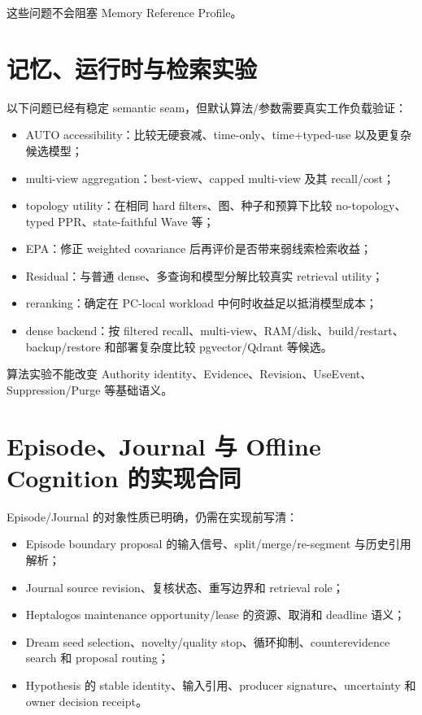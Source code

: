 这些问题不会阻塞 Memory Reference Profile。

\section{记忆、运行时与检索实验}

以下问题已经有稳定 semantic seam，但默认算法/参数需要真实工作负载验证：

\begin{itemize}
\item AUTO accessibility：比较无硬衰减、time-only、time+typed-use 以及更复杂候选模型；
\item multi-view aggregation：best-view、capped multi-view 及其 recall/cost；
\item topology utility：在相同 hard filters、图、种子和预算下比较 no-topology、typed PPR、state-faithful Wave 等；
\item EPA：修正 weighted covariance 后再评价是否带来弱线索检索收益；
\item Residual：与普通 dense、多查询和模型分解比较真实 retrieval utility；
\item reranking：确定在 PC-local workload 中何时收益足以抵消模型成本；
\item dense backend：按 filtered recall、multi-view、RAM/disk、build/restart、backup/restore 和部署复杂度比较 pgvector/Qdrant 等候选。
\end{itemize}

算法实验不能改变 Authority identity、Evidence、Revision、UseEvent、Suppression/Purge 等基础语义。

\section{Episode、Journal 与 Offline Cognition 的实现合同}

Episode/Journal 的对象性质已明确，仍需在实现前写清：

\begin{itemize}
\item Episode boundary proposal 的输入信号、split/merge/re-segment 与历史引用解析；
\item Journal source revision、复核状态、重写边界和 retrieval role；
\item Heptalogos maintenance opportunity/lease 的资源、取消和 deadline 语义；
\item Dream seed selection、novelty/quality stop、循环抑制、counterevidence search 和 proposal routing；
\item Hypothesis 的 stable identity、输入引用、producer signature、uncertainty 和 owner decision receipt。
\end{itemize}

